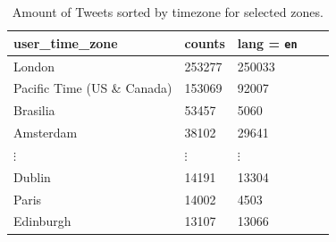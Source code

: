 \documentclass{emulateapj}
\begin{document}
\begin{table}
\centering
{\ttfamily
  \begin{tabular}{|l|l|l|l|l|}
    \hline
	user\_time\_zone & counts & lang = \texttt{en} \\ \hline \hline
	London & 253277 &  250033 \\ \hline %
	Pacific Time (US \& Canada) & 153069 & 92007 \\ \hline 
	Brasilia & 53457 & 5060 \\ \hline 
	Amsterdam & 38102 & 29641 \\ \hline 
	$\vdots$ & $\vdots$ & $\vdots$ \\ \hline 
	Dublin & 14191 & 13304 \\ \hline 
	Paris & 14002 & 4503\\ \hline 
	Edinburgh & 13107 & 13066\\ \hline 
  \end{tabular}
}
  \caption{\textnormal{Amount of Tweets sorted by timezone for selected zones.}
\label{table:user-time-zone}}
\end{table}

\newpage
\end{document}
